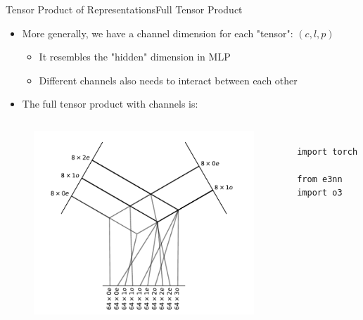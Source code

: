 \documentclass[pdf,serif]{beamer}
\begin{document}
\begin{frame}[fragile]{Tensor Product of Representations}{Full Tensor Product}
    \begin{itemize}
        \item More generally, we have a channel dimension for each "tensor": $(c, l, p)$
        \begin{itemize}
            \item It resembles the "hidden" dimension in MLP
            \item Different channels also needs to interact between each other
        \end{itemize}
        \item The full tensor product with channels is:
    \end{itemize}
    \begin{columns}
        \begin{figure}
            \includegraphics[width=\linewidth]{images/fulltp2.pdf}
        \end{figure}
        \begin{verbatim}
            import torch
            from e3nn import o3
    

\end{verbatim}
\end{columns}
\end{frame}
\end{document}
